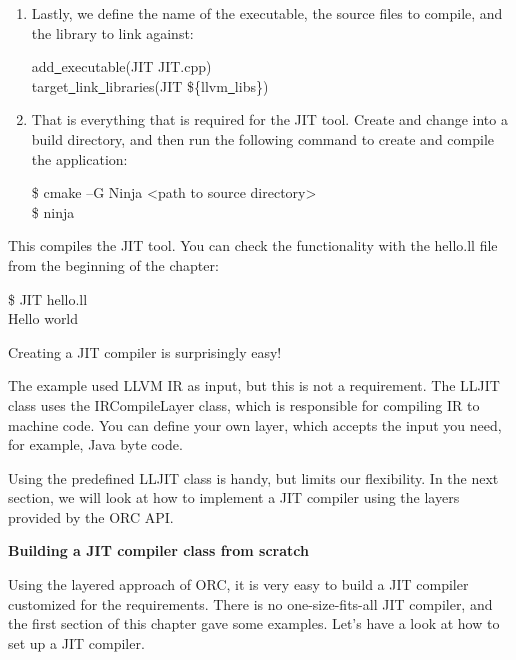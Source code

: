 \begin{enumerate}
\item Lastly, we define the name of the executable, the source files to compile, and the library to link against:
\begin{tcolorbox}[colback=white,colframe=black]
add\underline{~}executable(JIT JIT.cpp) \\
target\underline{~}link\underline{~}libraries(JIT \$\{llvm\underline{~}libs\})
\end{tcolorbox}

\item That is everything that is required for the JIT tool. Create and change into a build directory, and then run the following command to create and compile the application:
\begin{tcolorbox}[colback=white,colframe=black]
\$ cmake –G Ninja <path to source directory> \\
\$ ninja
\end{tcolorbox}

\end{enumerate}

This compiles the JIT tool. You can check the functionality with the hello.ll file from the beginning of the chapter:\par

\begin{tcolorbox}[colback=white,colframe=black]
\$ JIT hello.ll \\
Hello world
\end{tcolorbox}

Creating a JIT compiler is surprisingly easy!\par

The example used LLVM IR as input, but this is not a requirement. The LLJIT class uses the IRCompileLayer class, which is responsible for compiling IR to machine code. You can define your own layer, which accepts the input you need, for example, Java byte code.\par

Using the predefined LLJIT class is handy, but limits our flexibility. In the next section, we will look at how to implement a JIT compiler using the layers provided by the ORC API.\par

\hspace*{\fill} \par %
\textbf{Building a JIT compiler class from scratch}

Using the layered approach of ORC, it is very easy to build a JIT compiler customized for the requirements. There is no one-size-fits-all JIT compiler, and the first section of this chapter gave some examples. Let's have a look at how to set up a JIT compiler.\par

